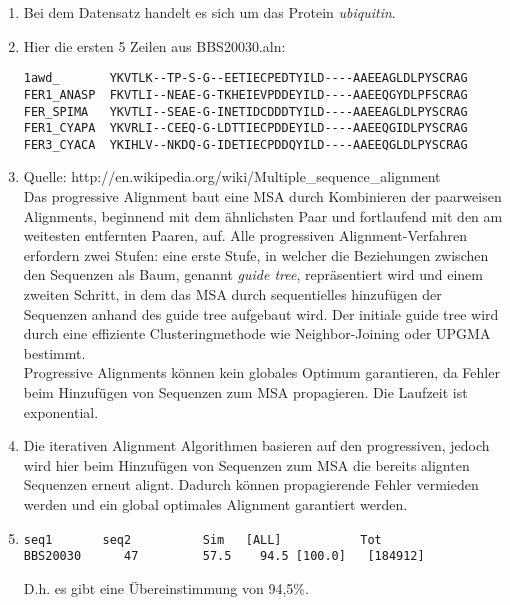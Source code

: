 \documentclass{homework}
\date{Montag, dem 12. November 2012}
\author{Stefan Meißner (4279113) und Niels Hoppe (4356370)}
\begin{document}
\maketitle
\begin{enumerate} 

\begin{enumerate}
\item Bei dem Datensatz handelt es sich um das Protein \textit{ubiquitin}.
\item Hier die ersten 5 Zeilen aus BBS20030.aln:
\begin{verbatim}
1awd_       YKVTLK--TP-S-G--EETIECPEDTYILD----AAEEAGLDLPYSCRAG
FER1_ANASP  FKVTLI--NEAE-G-TKHEIEVPDDEYILD----AAEEQGYDLPFSCRAG
FER_SPIMA   YKVTLI--SEAE-G-INETIDCDDDTYILD----AAEEAGLDLPYSCRAG
FER1_CYAPA  YKVRLI--CEEQ-G-LDTTIECPDDEYILD----AAEEQGIDLPYSCRAG
FER3_CYACA  YKIHLV--NKDQ-G-IDETIECPDDQYILD----AAEEQGLDLPYSCRAG
\end{verbatim}
\item Quelle: http://en.wikipedia.org/wiki/Multiple\_sequence\_alignment\\
Das progressive Alignment baut eine MSA durch Kombinieren der paarweisen Alignments, beginnend mit dem ähnlichsten Paar und fortlaufend mit den am weitesten entfernten Paaren, auf. Alle progressiven Alignment-Verfahren erfordern zwei Stufen: eine erste Stufe, in welcher die Beziehungen zwischen den Sequenzen als Baum, genannt \textit{guide tree}, repräsentiert wird und einem zweiten Schritt, in dem das MSA durch sequentielles hinzufügen der Sequenzen anhand des guide tree aufgebaut wird. Der initiale guide tree wird durch eine effiziente Clusteringmethode wie Neighbor-Joining oder UPGMA bestimmt. \\
Progressive Alignments können kein globales Optimum garantieren, da Fehler beim Hinzufügen von Sequenzen zum MSA propagieren. Die Laufzeit ist exponential.

\item Die iterativen Alignment Algorithmen basieren auf den progressiven, jedoch wird hier beim Hinzufügen von Sequenzen zum MSA die bereits alignten Sequenzen erneut alignt. Dadurch können propagierende Fehler vermieden werden und  ein global optimales Alignment garantiert werden.

\item
\begin{verbatim}
seq1       seq2          Sim   [ALL]           Tot  
BBS20030      47         57.5    94.5 [100.0]   [184912]
\end{verbatim}
D.h. es gibt eine Übereinstimmung von 94,5\%. 


\end{enumerate}
\end{enumerate}
\end{document}
